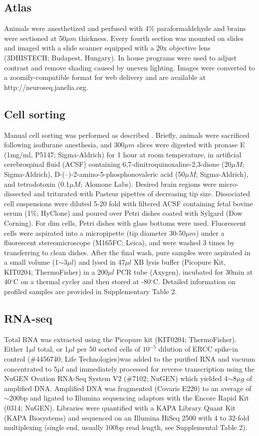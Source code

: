 \subsection{Atlas}
Animals were anesthetized and perfused with 4\% paraformaldehyde and brains were sectioned at 50$\mu m$ thickness. Every fourth section was mounted on slides and imaged with a slide scanner equipped with a 20x objective lens (3DHISTECH; Budapest, Hungary). In house programs were used to adjust contrast and remove shading caused by uneven lighting. Images were converted to a zoomify-compatible format for web delivery and are available at http://neuroseq.janelia.org.

\subsection{Cell sorting}
Manual cell sorting was performed as described \citep{Hempel_2007, Sugino_2014}. Briefly, animals were sacrificed following isoflurane anesthesia, and 300$\mu m$ slices were digested with pronase E (1mg/ml, P5147; Sigma-Aldrich) for 1 hour at room temperature, in artificial cerebrospinal fluid (ACSF) containing 6,7-dinitroquinoxaline-2,3-dione (20$\mu M$; Sigma-Aldrich), D-(–)-2-amino-5-phosphonovaleric acid (50$\mu M$; Sigma-Aldrich), and tetrodotoxin (0.1$\mu M$; Alomone Labs). Desired brain regions were micro-dissected and triturated with Pasteur pipettes of decreasing tip size. Dissociated cell suspensions were diluted 5-20 fold with filtered ACSF containing fetal bovine serum (1\%; HyClone) and poured over Petri dishes coated with Sylgard (Dow Corning). For dim cells, Petri dishes with glass bottoms were used. Fluorescent cells were aspirated into a micropipette (tip diameter 30-50$\mu m$) under a fluorescent stereomicroscope (M165FC; Leica), and were washed 3 times by transferring to clean dishes. After the final wash, pure samples were aspirated in a small volume (1$\sim$3$\mu l$) and lysed in 47$\mu l$ XB lysis buffer (Picopure Kit, KIT0204; ThermoFisher) in a 200$\mu l$ PCR tube (Axygen), incubated for 30min at 40$^{\circ}$C on a thermal cycler and then stored at -80$^{\circ}$C. Detailed information on profiled samples are provided in Supplementary Table 2.

\subsection{RNA-seq}
Total RNA was extracted using the Picopure kit (KIT0204; ThermoFisher). Either 1$\mu l$ total, or 1$\mu l$ per 50 sorted cells of $10^{-5}$ dilution of ERCC spike-in control (\#4456740; Life Technologies)was added to the purified RNA and vacuum concentrated to 5$\mu l$ and immediately processed for reverse transcription using the NuGEN Ovation RNA-Seq System V2 (\#7102; NuGEN) which yielded 4$\sim$8$\mu g$ of amplified DNA. Amplified DNA was fragmented (Covaris E220) to an average of $\sim$200bp and ligated to Illumina sequencing adaptors with the Encore Rapid Kit (0314; NuGEN). Libraries were quantified with a KAPA Library Quant Kit (KAPA Biosystems) and sequenced on an Illumina HiSeq 2500 with 4 to 32-fold multiplexing (single end, usually 100bp read length, see Supplemental Table 2).

